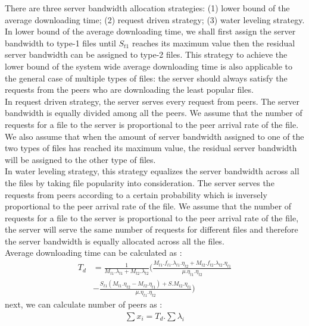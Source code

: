 \documentclass[conference]{IEEEtran}
\begin{document}
There are three server bandwidth allocation strategies:  (1) lower bound of the average downloading time; (2) request driven strategy; (3) water leveling strategy.
In lower bound of the average downloading time, we shall first assign the server bandwidth to type-1 files until $S_{t1}$ reaches its maximum value then the residual server bandwidth can be assigned to type-2 files.
This strategy to achieve the lower bound of the system wide average downloading time is also applicable to the general case of multiple types of files: the server should always satisfy the requests from the peers who are downloading the least popular files.\\
In request driven strategy, the server serves every request from peers. 
The server bandwidth is equally divided among all the peers.
We assume that the number of requests for a file to the server is proportional to the peer arrival rate of the file. 
We also assume that when the amount of server bandwidth assigned to one of the two types of files has reached its maximum value, the residual server bandwidth will be assigned to the other type of files.\\
In water leveling strategy, this strategy equalizes the server bandwidth across all the files by taking file popularity into consideration. 
The server serves the requests from peers according to a certain probability which is inversely proportional to the peer arrival rate of the file.
We assume that the number of requests for a file to the server is proportional to the peer arrival rate of the file, the server will serve the same number of requests for different files and therefore the server bandwidth is equally allocated across all the files.\\
Average downloading time can be calculated as \cite{Sun:2009:POS:1542245.1542249}:
\begin{equation}\label{eqn:averagetimedownload}
\begin{split}
T_d &= \frac{1}{M_{t1}.\lambda_{t1} + M_{t2}.\lambda_{t2}}(\frac{M_{t1}.f_{t1}.\lambda_{t1}.\eta_{t2} + M_{t2}.f_{t2}.\lambda_{t2}.\eta_{t1}}{\mu.\eta_{t1}.\eta_{t2}}  \\ 
   & - \frac{S_{t1} (M_{t1}.\eta_{t2}-M_{t2}.\eta_{t1}) + S.M_{t2}.\eta_{t1}}{\mu.\eta_{t1}.\eta_{t2}}) 
\end{split}	
\end{equation} 
next, we can calculate number of peers as \cite{Sun:2009:POS:1542245.1542249}:
\begin{equation}\label{eqn:numofpeers}
\begin{split}
\sum x_i = T_d . \sum \lambda_i
\end{split}	
\end{equation} 
\end{document}
